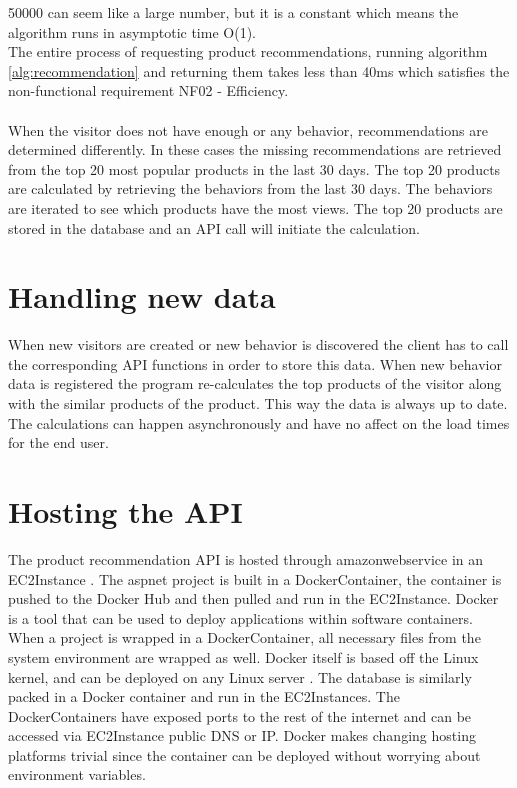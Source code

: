 50000 can seem like a large number, but it is a constant which means the algorithm runs in asymptotic time O(1). \\
The entire process of requesting product recommendations, running algorithm \ref{alg:recommendation} and returning them takes less than 40ms which satisfies the non-functional requirement NF02 - Efficiency. \\\\
When the visitor does not have enough or any behavior, recommendations are determined differently. In these cases the missing recommendations are retrieved from the top 20 most popular products in the last 30 days. The top 20 products are calculated by retrieving the behaviors from the last 30 days. The behaviors are iterated to see which products have the most views. The top 20 products are stored in the database and an \gls{API} call will initiate the calculation.

\section{Handling new data}
When new visitors are created or new behavior is discovered the client has to call the corresponding \gls{API} functions in order to store this data. When new behavior data is registered the program re-calculates the top products of the visitor along with the similar products of the product. This way the data is always up to date. The calculations can happen asynchronously and have no affect on the load times for the end user.

\section{Hosting the \gls{API}}
The product recommendation \gls{API} is hosted through \gls{amazonwebservice} in an \gls{EC2Instance} \cite{EC2}. The \gls{aspnet} project is built in a \gls{DockerContainer}, the container is pushed to the \gls{Docker} Hub and then pulled and run in the \gls{EC2Instance}. \Gls{Docker} is a tool that can be used to deploy applications within software containers. When a project is wrapped in a \gls{DockerContainer}, all necessary files from the system environment are wrapped as well. \Gls{Docker} itself is based off the Linux kernel, and can be deployed on any Linux server \cite{Docker}.  The database is similarly packed in a \gls{Docker} container and run in the \glspl{EC2Instance}. The \glspl{DockerContainer} have exposed ports to the rest of the internet and can be accessed via \gls{EC2Instance} public DNS or IP.  \gls{Docker} makes changing hosting platforms trivial since the container can be deployed without worrying about environment variables.



			


 